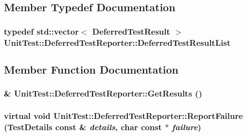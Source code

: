 \subsection{Member Typedef Documentation}
\hypertarget{class_unit_test_1_1_deferred_test_reporter_213b003cf9804c9e99d48d2b25d580bc}{
\subsubsection[{DeferredTestResultList}]{\setlength{\rightskip}{0pt plus 5cm}typedef std::vector$<$ {\bf DeferredTestResult} $>$ {\bf UnitTest::DeferredTestReporter::DeferredTestResultList}}}
\label{class_unit_test_1_1_deferred_test_reporter_213b003cf9804c9e99d48d2b25d580bc}




\subsection{Member Function Documentation}
\hypertarget{class_unit_test_1_1_deferred_test_reporter_c52ecee8df771126c5c95c31e1623e47}{
\subsubsection[{GetResults}]{\& UnitTest::DeferredTestReporter::GetResults ()}}
\label{class_unit_test_1_1_deferred_test_reporter_c52ecee8df771126c5c95c31e1623e47}


\hypertarget{class_unit_test_1_1_deferred_test_reporter_32e8e1e99e3169072d8f49f92f27ed5c}{
\subsubsection[{ReportFailure}]{\setlength{\rightskip}{0pt plus 5cm}virtual void UnitTest::DeferredTestReporter::ReportFailure ({\bf TestDetails} const \& {\em details}, \/  char const $\ast$ {\em failure})}}
\label{class_unit_test_1_1_deferred_test_reporter_32e8e1e99e3169072d8f49f92f27ed5c}




